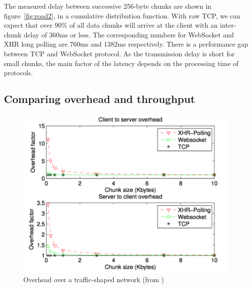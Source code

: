 \documentclass[10pt,journal,compsoc]{IEEEtran}
\newcommand{\ws}{WebSocket}
\begin{document}
The measured delay between successive 256-byte chunks are shown in figure~\ref{fig:road2}, in a cumulative distribution function.
With raw TCP, we can expect that over 90\% of all data chunks will arrive at the client with an inter-chunk delay of 360ms or less. The corresponding numbers for \ws{} and XHR long polling are $760$ms and $1382$ms respectively.
There is a performance gap between TCP and \ws{} protocol.
As the transmission delay is short for small chunks, the main factor of the latency depends on the processing time of protocols.

\subsection{Comparing overhead and throughput}

\begin{figure}[!ht]
    \centering
    \includegraphics[width=\linewidth]{road4.png}
    \caption{Overhead over a traffic-shaped network (from \cite{roadblock})}
    \label{fig:road4}
\end{figure}
\end{document}
